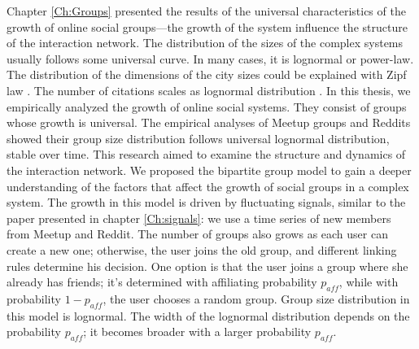 Chapter \ref{Ch:Groups} presented the results of the universal characteristics of the growth of online social groups—the growth of the system influence the structure of the interaction network. The distribution of the sizes of the complex systems usually follows some universal curve. In many cases, it is lognormal or power-law. The distribution of the dimensions of the city sizes could be explained with Zipf law \cite{gabaix1999}. The number of citations scales as lognormal distribution \cite{radicchi2008}. In this thesis, we empirically analyzed the growth of online social systems. They consist of groups whose growth is universal. The empirical analyses of Meetup groups and Reddits showed their group size distribution follows universal lognormal distribution, stable over time. This research aimed to examine the structure and dynamics of the interaction network. We proposed the bipartite group model to gain a deeper understanding of the factors that affect the growth of social groups in a complex system. The growth in this model is driven by fluctuating signals, similar to the paper presented in chapter \ref{Ch:signals}: we use a time series of new members from Meetup and Reddit. The number of groups also grows as each user can create a new one; otherwise, the user joins the old group, and different linking rules determine his decision. One option is that the user joins a group where she already has friends; it's determined with affiliating probability  $p_{aff}$, while with probability $1-p_{aff}$, the user chooses a random group. Group size distribution in this model is lognormal. The width of the lognormal distribution depends on the probability $p_{aff}$; it becomes broader with a larger probability $p_{aff}$. 


